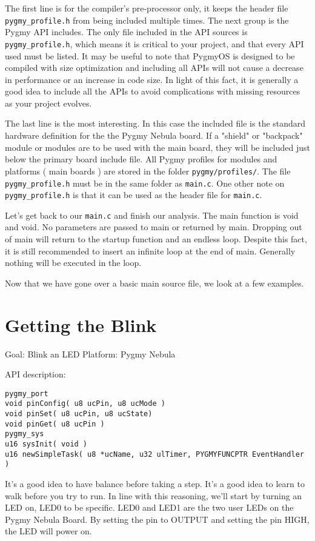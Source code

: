 \documentclass{article}
\begin{document}
The first line is for the compiler's pre-processor only, it keeps the header file \verb|pygmy_profile.h| from being included multiple times. The next group is the Pygmy API includes. The only file included in the API sources is \verb|pygmy_profile.h|, which means it is critical to your project, and that every API used must be listed. It may be useful to note that PygmyOS is designed to be compiled with size optimization and including all APIs will not cause a decrease in performance or an increase in code size. In light of this fact, it is generally a good idea to include all the APIs to avoid complications with missing resources as your project evolves.

The last line is the most interesting. In this case the included file is the standard hardware definition for the the Pygmy Nebula board. If a "shield" or "backpack" module or modules are to be used with the main board, they will be included just below the primary board include file. All Pygmy profiles for modules and platforms ( main boards ) are stored in the folder \verb|pygmy/profiles/|. The file \verb|pygmy_profile.h| must be in the same folder as \verb|main.c|. One other note on \verb|pygmy_profile.h| is that it can be used as the header file for \verb|main.c|.

Let's get back to our \verb|main.c| and finish our analysis. The main function is void and void. No parameters are passed to main or returned by main. Dropping out of main will return to the startup function and an endless loop. Despite this fact, it is still recommended to insert an infinite loop at the end of main. Generally nothing will be executed in the loop.

Now that we have gone over a basic main source file, we look at a few examples.

\section{Getting the Blink}
Goal: Blink an LED
Platform: Pygmy Nebula

API description:
\begin{lstlisting}
pygmy_port
void pinConfig( u8 ucPin, u8 ucMode )
void pinSet( u8 ucPin, u8 ucState)
void pinGet( u8 ucPin )
pygmy_sys
u16 sysInit( void )
u16 newSimpleTask( u8 *ucName, u32 ulTimer, PYGMYFUNCPTR EventHandler )
\end{lstlisting}

It's a good idea to have balance before taking a step. It's a good idea to learn to walk before you try to run. In line with this reasoning, we'll start by turning an LED on, LED0 to be specific. LED0 and LED1 are the two user LEDs on the Pygmy Nebula Board. By setting the pin to OUTPUT and setting the pin HIGH, the LED will power on.
\end{document}
